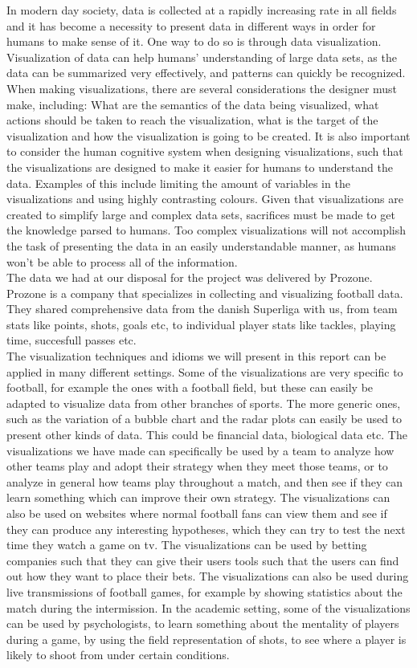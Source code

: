 \documentclass[Report.tex]{subfiles}
\begin{document}
In modern day society, data is collected at a rapidly increasing rate in all fields and it has become a necessity to present data in different ways in order for humans to make sense of it. One way to do so is through data visualization. Visualization of data can help humans' understanding of large data sets, as the data can be summarized very effectively, and patterns can quickly be recognized. When making visualizations, there are several considerations the designer must make, including: What are the semantics of the data being visualized, what actions should be taken to reach the visualization, what is the target of the visualization and how the visualization is going to be created. It is also important to consider the human cognitive system when designing visualizations, such that the visualizations are designed to make it easier for humans to understand the data. Examples of this include limiting the amount of variables in the visualizations and using highly contrasting colours. Given that visualizations are created to simplify large and complex data sets, sacrifices must be made to get the knowledge parsed to humans. Too complex visualizations will not accomplish the task of presenting the data in an easily understandable manner, as humans won’t be able to process all of the information.\\
The data we had at our disposal for the project was delivered by Prozone. Prozone is a company that specializes in collecting and visualizing football data. They shared comprehensive data from the danish Superliga with us, from team stats like points, shots, goals etc, to individual player stats like tackles, playing time, succesfull passes etc.\\
The visualization techniques and idioms we will present in this report can be applied in many different settings. Some of the visualizations are very specific to football, for example the ones with a football field, but these can easily be adapted to visualize data from other branches of sports. The more generic ones, such as the variation of a bubble chart and the radar plots can easily be used to present other kinds of data. This could be financial data, biological data etc. The visualizations we have made can specifically be used by a team to analyze how other teams play and adopt their strategy when they meet those teams, or to analyze in general how teams play throughout a match, and then see if they can learn something which can improve their own strategy. The visualizations can also be used on websites where normal football fans can view them and see if they can produce any interesting hypotheses, which they can try to test the next time they watch a game on tv. The visualizations can be used by betting companies such that they can give their users tools such that the users can find out how they want to place their bets. The visualizations can also be used during live transmissions of football games, for example by showing statistics about the match during the intermission. In the academic setting, some of the visualizations can be used by psychologists, to learn something about the mentality of players during a game, by using the field representation of shots, to see where a player is likely to shoot from under certain conditions.\\
\end{document}
